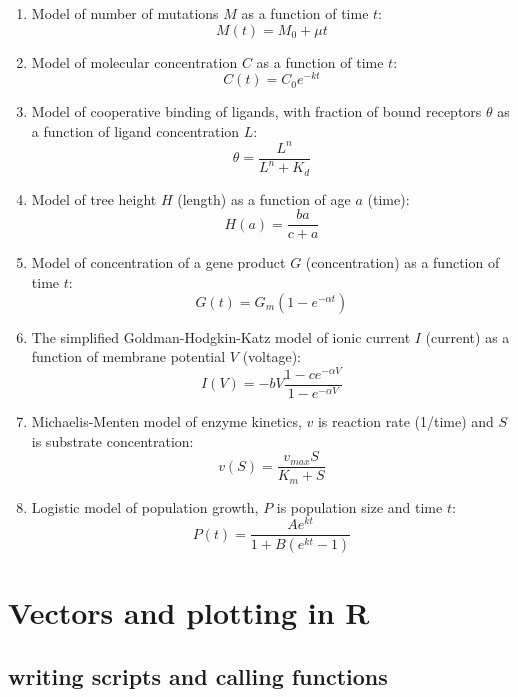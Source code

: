 \documentclass[
]{book}
\theoremstyle{definition}
\theoremstyle{definition}
\theoremstyle{definition}
\theoremstyle{remark}
\begin{document}
\begin{enumerate}
\def\labelenumi{\arabic{enumi}.}
\item
  Model of number of mutations \(M\) as a function of time \(t\):
  \[ M(t) = M_0 + \mu t\]
\item
  Model of molecular concentration \(C\) as a function of time \(t\):
  \[ C(t) = C_0 e^{-kt} \]
\item
  Model of cooperative binding of ligands, with fraction of bound receptors \(\theta\) as a function of ligand concentration \(L\):
  \[ \theta = \frac{L^n}{L^n + K_d}\]
\item
  Model of tree height \(H\) (length) as a function of age \(a\) (time):
  \[ H(a) = \frac{b a }{c + a}\]
\item
  Model of concentration of a gene product \(G\) (concentration) as a function of time \(t\):
  \[ G(t) = G_m (1 - e^{-\alpha t})\]
\item
  The simplified Goldman-Hodgkin-Katz model of ionic current \(I\) (current) as a function of membrane potential \(V\) (voltage):
  \[ I(V) = - b V \frac{1- c e^{-\alpha V}} {1-  e^{-\alpha V}} \]
\item
  Michaelis-Menten model  of enzyme kinetics, \(v\) is reaction rate (1/time) and \(S\) is substrate concentration:
  \[ v(S) = \frac{v_{max} S}{K_m + S}\]
\item
  Logistic model of population growth, \(P\) is population size and time \(t\):
  \[ P(t) = \frac{A e^{kt}}{1 + B(e^{kt} -1)} \]
\end{enumerate}

\hypertarget{vectors-and-plotting-in-r}{%
\section{Vectors and plotting in R}\label{vectors-and-plotting-in-r}}

\label{sec:comp2}

\hypertarget{writing-scripts-and-calling-functions}{%
\subsection{writing scripts and calling functions}\label{writing-scripts-and-calling-functions}}
\end{document}
